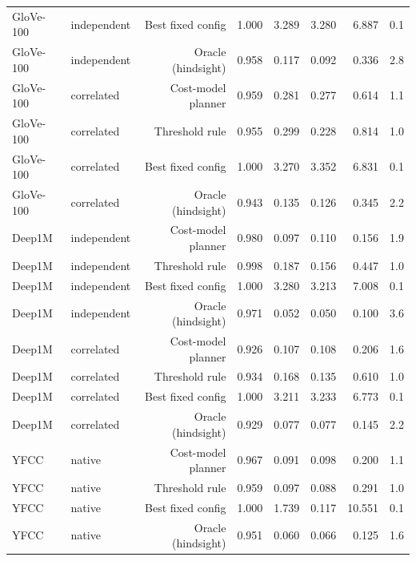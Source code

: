 \begin{table}[t]
\begin{tabular}{llrrrrrr}
GloVe-100 & independent & Best fixed config & 1.000 & 3.289 & 3.280 & 6.887 & 0.1 \\
GloVe-100 & independent & Oracle (hindsight) & 0.958 & 0.117 & 0.092 & 0.336 & 2.8 \\
GloVe-100 & correlated & Cost-model planner & 0.959 & 0.281 & 0.277 & 0.614 & 1.1 \\
GloVe-100 & correlated & Threshold rule & 0.955 & 0.299 & 0.228 & 0.814 & 1.0 \\
GloVe-100 & correlated & Best fixed config & 1.000 & 3.270 & 3.352 & 6.831 & 0.1 \\
GloVe-100 & correlated & Oracle (hindsight) & 0.943 & 0.135 & 0.126 & 0.345 & 2.2 \\
Deep1M & independent & Cost-model planner & 0.980 & 0.097 & 0.110 & 0.156 & 1.9 \\
Deep1M & independent & Threshold rule & 0.998 & 0.187 & 0.156 & 0.447 & 1.0 \\
Deep1M & independent & Best fixed config & 1.000 & 3.280 & 3.213 & 7.008 & 0.1 \\
Deep1M & independent & Oracle (hindsight) & 0.971 & 0.052 & 0.050 & 0.100 & 3.6 \\
Deep1M & correlated & Cost-model planner & 0.926 & 0.107 & 0.108 & 0.206 & 1.6 \\
Deep1M & correlated & Threshold rule & 0.934 & 0.168 & 0.135 & 0.610 & 1.0 \\
Deep1M & correlated & Best fixed config & 1.000 & 3.211 & 3.233 & 6.773 & 0.1 \\
Deep1M & correlated & Oracle (hindsight) & 0.929 & 0.077 & 0.077 & 0.145 & 2.2 \\
YFCC & native & Cost-model planner & 0.967 & 0.091 & 0.098 & 0.200 & 1.1 \\
YFCC & native & Threshold rule & 0.959 & 0.097 & 0.088 & 0.291 & 1.0 \\
YFCC & native & Best fixed config & 1.000 & 1.739 & 0.117 & 10.551 & 0.1 \\
YFCC & native & Oracle (hindsight) & 0.951 & 0.060 & 0.066 & 0.125 & 1.6 \\
\bottomrule
\end{tabular}
\end{table}
